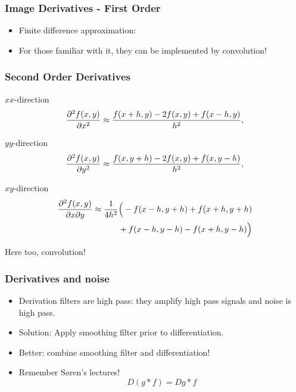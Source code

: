 \documentclass[9pt]{beamer}
\begin{document}
\begin{frame}
  \frametitle{Image Derivatives - First Order}
  \begin{itemize}
  \item Finite difference approximation:
  \item For those familiar with it, they can be implemented by convolution!
  \end{itemize}
\end{frame}

\begin{frame}
  \frametitle{Second Order Derivatives}

  \begin{itemize}{\fontsize{8}{6}\selectfont
  \item $xx$-direction
    $$
    \frac{\partial^{2}{f(x,y)}}{\partial{x^2}} \approx\frac{f(x+h,y)-2f(x,y)+f(x-h,y)}{h^2},
    $$
  \item $yy$-direction
    $$
    \frac{\partial^{2}{f(x,y)}}{\partial{y^2}} \approx\frac{f(x,y+h)-2f(x,y)+f(x,y-h)}{h^2},
    $$
  \item $xy$-direction
    \begin{align*}
    \frac{\partial^{2}{f(x,y)}}{\partial{x\partial y}}\approx \frac{1}{4h^2}&\Big(
      -f(x-h,y+h) +f(x+h,y+h)\\
      &+f(x-h,y-h)  -f(x+h,y-h)\Big)
    \end{align*}
  \item Here too, convolution!
  }
  \end{itemize}
\end{frame}




\begin{frame}
  \frametitle{Derivatives and noise}
  \begin{itemize}
  \item Derivation filters are high pass: they amplify high pass signals and noise is high pass.
  \item Solution: Apply smoothing filter prior to differentiation.\vfill 
  \item Better: combine smoothing filter and differentiation!\vfill
  \item Remember S{\o}ren's lectures!
    $$
    D\left( g\ast f\right) = Dg\ast f
    $$
  \end{itemize}
\end{frame}
\end{document}
